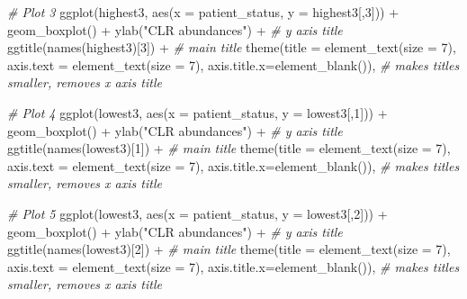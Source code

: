 \documentclass[
]{book}
\newenvironment{Shaded}{\begin{snugshade}}{\end{snugshade}}
\newcommand{\AttributeTok}[1]{\textcolor[rgb]{0.77,0.63,0.00}{#1}}
\newcommand{\CommentTok}[1]{\textcolor[rgb]{0.56,0.35,0.01}{\textit{#1}}}
\newcommand{\DecValTok}[1]{\textcolor[rgb]{0.00,0.00,0.81}{#1}}
\newcommand{\FunctionTok}[1]{\textcolor[rgb]{0.00,0.00,0.00}{#1}}
\newcommand{\NormalTok}[1]{#1}
\newcommand{\SpecialCharTok}[1]{\textcolor[rgb]{0.00,0.00,0.00}{#1}}
\newcommand{\StringTok}[1]{\textcolor[rgb]{0.31,0.60,0.02}{#1}}
\begin{document}
\begin{Shaded}
\begin{Highlighting}[]
  \CommentTok{\# Plot 3}
  \FunctionTok{ggplot}\NormalTok{(highest3, }\FunctionTok{aes}\NormalTok{(}\AttributeTok{x =}\NormalTok{ patient\_status, }\AttributeTok{y =}\NormalTok{ highest3[,}\DecValTok{3}\NormalTok{])) }\SpecialCharTok{+} 
    \FunctionTok{geom\_boxplot}\NormalTok{() }\SpecialCharTok{+} 
    \FunctionTok{ylab}\NormalTok{(}\StringTok{"CLR abundances"}\NormalTok{) }\SpecialCharTok{+} \CommentTok{\# y axis title}
    \FunctionTok{ggtitle}\NormalTok{(}\FunctionTok{names}\NormalTok{(highest3)[}\DecValTok{3}\NormalTok{]) }\SpecialCharTok{+} \CommentTok{\# main title}
    \FunctionTok{theme}\NormalTok{(}\AttributeTok{title =} \FunctionTok{element\_text}\NormalTok{(}\AttributeTok{size =} \DecValTok{7}\NormalTok{),}
          \AttributeTok{axis.text =} \FunctionTok{element\_text}\NormalTok{(}\AttributeTok{size =} \DecValTok{7}\NormalTok{),}
          \AttributeTok{axis.title.x=}\FunctionTok{element\_blank}\NormalTok{()), }\CommentTok{\# makes titles smaller, removes x axis title}
  
  \CommentTok{\# Plot 4}
  \FunctionTok{ggplot}\NormalTok{(lowest3, }\FunctionTok{aes}\NormalTok{(}\AttributeTok{x =}\NormalTok{ patient\_status, }\AttributeTok{y =}\NormalTok{ lowest3[,}\DecValTok{1}\NormalTok{])) }\SpecialCharTok{+} 
    \FunctionTok{geom\_boxplot}\NormalTok{() }\SpecialCharTok{+} 
    \FunctionTok{ylab}\NormalTok{(}\StringTok{"CLR abundances"}\NormalTok{) }\SpecialCharTok{+} \CommentTok{\# y axis title}
    \FunctionTok{ggtitle}\NormalTok{(}\FunctionTok{names}\NormalTok{(lowest3)[}\DecValTok{1}\NormalTok{]) }\SpecialCharTok{+} \CommentTok{\# main title}
    \FunctionTok{theme}\NormalTok{(}\AttributeTok{title =} \FunctionTok{element\_text}\NormalTok{(}\AttributeTok{size =} \DecValTok{7}\NormalTok{),}
          \AttributeTok{axis.text =} \FunctionTok{element\_text}\NormalTok{(}\AttributeTok{size =} \DecValTok{7}\NormalTok{),}
          \AttributeTok{axis.title.x=}\FunctionTok{element\_blank}\NormalTok{()), }\CommentTok{\# makes titles smaller, removes x axis title}
  
  \CommentTok{\# Plot 5}
  \FunctionTok{ggplot}\NormalTok{(lowest3, }\FunctionTok{aes}\NormalTok{(}\AttributeTok{x =}\NormalTok{ patient\_status, }\AttributeTok{y =}\NormalTok{ lowest3[,}\DecValTok{2}\NormalTok{])) }\SpecialCharTok{+} 
    \FunctionTok{geom\_boxplot}\NormalTok{() }\SpecialCharTok{+} 
    \FunctionTok{ylab}\NormalTok{(}\StringTok{"CLR abundances"}\NormalTok{) }\SpecialCharTok{+} \CommentTok{\# y axis title}
    \FunctionTok{ggtitle}\NormalTok{(}\FunctionTok{names}\NormalTok{(lowest3)[}\DecValTok{2}\NormalTok{]) }\SpecialCharTok{+} \CommentTok{\# main title}
    \FunctionTok{theme}\NormalTok{(}\AttributeTok{title =} \FunctionTok{element\_text}\NormalTok{(}\AttributeTok{size =} \DecValTok{7}\NormalTok{),}
          \AttributeTok{axis.text =} \FunctionTok{element\_text}\NormalTok{(}\AttributeTok{size =} \DecValTok{7}\NormalTok{),}
          \AttributeTok{axis.title.x=}\FunctionTok{element\_blank}\NormalTok{()), }\CommentTok{\# makes titles smaller, removes x axis title}
  

\end{Highlighting}
\end{Shaded}
\end{document}
